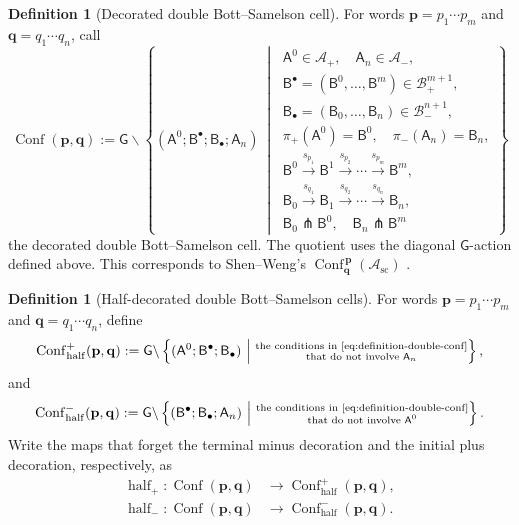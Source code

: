\documentclass[10pt,a4paper]{article}
\theoremstyle{definition}
\newtheorem{definition}[theorem]{Definition}
\theoremstyle{remark}
\newcommand{\Aplus}{\mathcal A_+}
\newcommand{\Aminus}{\mathcal A_-}
\newcommand{\Bplus}{\mathcal B_+}
\newcommand{\Bminus}{\mathcal B_-}
\newcommand{\flagA}{\mathsf{A}}
\newcommand{\flagB}{\mathsf{B}}
\newcommand{\groupG}{\mathsf{G}}
\newcommand{\Conf}{\operatorname{Conf}}
\newcommand{\Confhalf}{\operatorname{Conf}_{\mathrm{half}}}
\begin{document}
\begin{definition}[Decorated double Bott--Samelson cell]
\label{def:double-bs-cell}
For words \(\mathbf p=p_1\cdots p_m\) and
\(\mathbf q=q_1\cdots q_n\), call
\begin{equation}
 \Conf(\mathbf p,\mathbf q)
 :=
 \groupG\backslash
 \left\{
 (\flagA^0;\flagB^\bullet;\flagB_\bullet;\flagA_n)
 \ \middle|\
 \begin{gathered}
  \flagA^0\in\Aplus,\quad
  \flagA_n\in\Aminus, \\
  \flagB^\bullet=(\flagB^0,\ldots,\flagB^m)\in\Bplus^{m+1},\\
  \flagB_\bullet=(\flagB_0,\ldots,\flagB_n)\in\Bminus^{n+1},\\
  \pi_+(\flagA^0)=\flagB^0,\quad \pi_-(\flagA_n)=\flagB_n,\\
  \flagB^0\xrightarrow{s_{p_1}}\flagB^1
  \xrightarrow{s_{p_2}}\cdots
  \xrightarrow{s_{p_m}}\flagB^m,\\
  \flagB_0\xrightarrow{s_{q_1}}\flagB_1
  \xrightarrow{s_{q_2}}\cdots
  \xrightarrow{s_{q_n}}\flagB_n,\\
  \flagB_0\pitchfork\flagB^0,\quad \flagB_n\pitchfork\flagB^m
 \end{gathered}
 \right\}
 \label{eq:definition-double-conf}
\end{equation}
the decorated double Bott--Samelson cell.  The quotient uses the diagonal
\(\groupG\)-action defined above.  This corresponds to Shen--Weng's
\(\Conf^{\,\mathbf p}_{\mathbf q}(\mathcal A_{\mathrm{sc}})\)
\cite[Definition~2.21 and Remark~2.22]{ShenWeng2021}.
\end{definition}

\begin{definition}[Half-decorated double Bott--Samelson cells]
\label{def:half-conf}
For words \(\mathbf p=p_1\cdots p_m\) and
\(\mathbf q=q_1\cdots q_n\), define
\begin{equation}
 \Confhalf^+(\mathbf p,\mathbf q)
 :=
 \groupG\backslash
 \left\{
 (\flagA^0;\flagB^\bullet;\flagB_\bullet)
 \ \middle|\
 \substack{
  \text{the conditions in~\eqref{eq:definition-double-conf}}\\
  \text{that do not involve }\flagA_n
  }
 \right\},
 \label{eq:definition-half-conf-plus}
\end{equation}
and
\begin{equation}
 \Confhalf^-(\mathbf p,\mathbf q)
 :=
 \groupG\backslash
 \left\{
 (\flagB^\bullet;\flagB_\bullet;\flagA_n)
 \ \middle|\
 \substack{
  \text{the conditions in~\eqref{eq:definition-double-conf}}\\
  \text{that do not involve }\flagA^0
  }
 \right\}.
 \label{eq:definition-half-conf-minus}
\end{equation}
Write the maps that forget the terminal minus decoration and the initial plus
decoration, respectively, as
\begin{align*}
 \operatorname{half}_+:
 \Conf(\mathbf p,\mathbf q)
 &\longrightarrow\Confhalf^+(\mathbf p,\mathbf q),\\
 \operatorname{half}_-:
 \Conf(\mathbf p,\mathbf q)
 &\longrightarrow\Confhalf^-(\mathbf p,\mathbf q).
\end{align*}
\end{definition}
\end{document}
